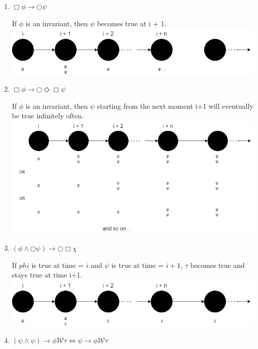 \documentclass[12pt]{article}
\begin{document}
\begin{enumerate}

	\item $\Box \phi \rightarrow \bigcirc \psi $
	
		\noindent If $\phi$ is an invariant, then $\psi$ becomes true at i + 1.\\
		\includegraphics[scale=0.5]{p2.1.png}

	\item $\Box \phi \rightarrow \bigcirc \Diamond \Box \psi$
		
		\noindent If $\phi$ is an invariant, then $\psi$ starting from the next moment i+1 will eventually be true infinitely often.\\
		\includegraphics[scale=0.55]{p2.2.png}

	\item $(\phi \wedge \bigcirc \psi) \rightarrow \bigcirc \Box \chi $	

	
		\noindent If $phi$ is true at time = $i$ and $\psi$ is true at time = $i + 1$,
				$\tau$ becomes true and stays true at time i+1.\\
		\includegraphics[scale=0.55]{p2.3.png}
	
	\item $( \psi \wedge \psi) \rightarrow \phi \mathcal{W} \tau \Longleftrightarrow
	 \psi \rightarrow \phi \mathcal{W} \tau$



\end{enumerate}
\end{document}
